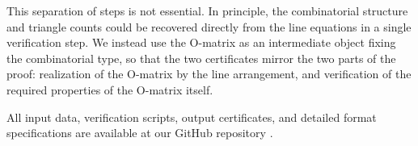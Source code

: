 This separation of steps is not essential. In principle, the combinatorial structure and
triangle counts could be recovered directly from the line equations in a single
verification step. We instead use the $\mathrm{O}$-matrix as an intermediate
object fixing the combinatorial type, so that the two certificates mirror the
two parts of the proof: realization of the $\mathrm{O}$-matrix by the line
arrangement, and verification of the required properties of the
$\mathrm{O}$-matrix itself.

All input data, verification scripts, output certificates,
and detailed format specifications are available at our GitHub repository
\cite{repo}.
